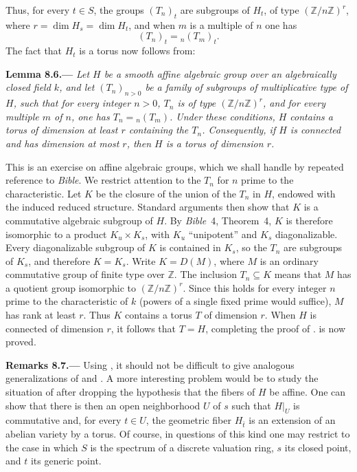 Thus, for every \(t\in S\), the groups \((T_n)_t\) are subgroups of
\(H_t\), of type \((\mathbb{Z}/n\mathbb{Z})^r\), where
\(r=\dim H_s=\dim H_t\), and when \(m\) is a multiple of \(n\) one has
\[
  (T_n)_t={}_n(T_m)_t.
\]
The fact that \(H_t\) is a torus now follows from:

\par\medskip\noindent{}\textbf{Lemma 8.6.---}\enspace
\emph{Let \(H\) be a smooth affine algebraic group over an algebraically
closed field \(k\), and let \((T_n)_{n>0}\) be a family of subgroups of
multiplicative type of \(H\), such that for every integer \(n>0\), \(T_n\)
is of type \((\mathbb{Z}/n\mathbb{Z})^r\), and for every multiple \(m\) of
\(n\), one has \(T_n={}_n(T_m)\). Under these conditions, \(H\) contains
a torus of dimension at least \(r\) containing the \(T_n\). Consequently,
if \(H\) is connected and has dimension at most \(r\), then \(H\) is a
torus of dimension \(r\).}

This is an exercise on affine algebraic groups, which we shall handle by
repeated reference to \emph{Bible}. We restrict attention to the \(T_n\)
for \(n\) prime to the characteristic. Let \(K\) be the closure of the
union of the \(T_n\) in \(H\), endowed with the induced reduced structure.
Standard arguments then show that \(K\) is a commutative algebraic
subgroup of \(H\). By \emph{Bible}~4, Theorem~4, \(K\) is therefore isomorphic
to a product \(K_u\times K_s\), with \(K_u\) ``unipotent'' and \(K_s\)
diagonalizable. Every diagonalizable subgroup of \(K\) is contained in
\(K_s\), so the \(T_n\) are subgroups of \(K_s\), and therefore
\(K=K_s\). Write \(K=D(M)\), where \(M\) is an ordinary commutative group
of finite type over \(\mathbb{Z}\). The inclusion \(T_n\subseteq K\)
means that \(M\) has a quotient group isomorphic to
\((\mathbb{Z}/n\mathbb{Z})^r\). Since this holds for every integer \(n\)
prime to the characteristic of \(k\) (powers of a single fixed prime
would suffice), \(M\) has rank at least \(r\). Thus \(K\) contains a torus
\(T\) of dimension \(r\). When \(H\) is connected of dimension \(r\), it
follows that \(T=H\), completing the proof of .  is now
proved.

\par\medskip\noindent{}\textbf{Remarks 8.7.---}\enspace
Using , it should not be difficult to give analogous generalizations of
 and . A more interesting problem would be to study the situation of
 after dropping the hypothesis that the fibers of \(H\) be affine. One
can show that there is then an open neighborhood \(U\) of \(s\) such that
\(H|_U\) is commutative and, for every \(t\in U\), the geometric fiber
\(H_{\bar t}\) is an extension of an abelian variety by a
torus. Of course,
in questions of this kind one may restrict to the case in which \(S\) is
the spectrum of a discrete valuation ring, \(s\) its closed point, and
\(t\) its generic point.

